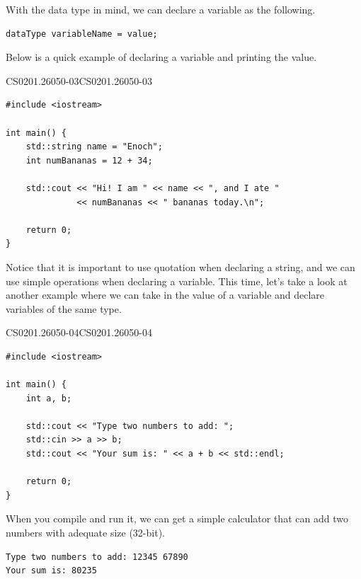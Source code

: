 \documentclass[../../main.tex]{subfiles}
\begin{document}
With the data type in mind, we can declare a variable as the
following.

\begin{basicbox}
\begin{lstlisting}[style=cppstyle]
dataType variableName = value;
\end{lstlisting}
\end{basicbox}

Below is a quick example of declaring a variable and printing
the value.

\begin{cppbox}{CS0201.26050-03}{CS0201.26050-03}
\begin{lstlisting}[style=cppstyle]
#include <iostream>

int main() {
    std::string name = "Enoch";
    int numBananas = 12 + 34;

    std::cout << "Hi! I am " << name << ", and I ate "
              << numBananas << " bananas today.\n";

    return 0;
}
\end{lstlisting}
\end{cppbox}

Notice that it is important to use quotation when declaring a
string, and we can use simple operations when declaring a variable.
This time, let's take a look at another example where we can
take in the value of a variable and declare variables of the same
type.

\begin{cppbox}{CS0201.26050-04}{CS0201.26050-04}
\begin{lstlisting}[style=cppstyle]
#include <iostream>

int main() {
    int a, b;

    std::cout << "Type two numbers to add: ";
    std::cin >> a >> b;
    std::cout << "Your sum is: " << a + b << std::endl;
    
    return 0;
}
\end{lstlisting}
\end{cppbox}

When you compile and run it, we can get a simple calculator that
can add two numbers with adequate size (32-bit).

\begin{outputbox}
\begin{lstlisting}[style=basic]
Type two numbers to add: 12345 67890
Your sum is: 80235
\end{lstlisting}
\end{outputbox}
\end{document}
